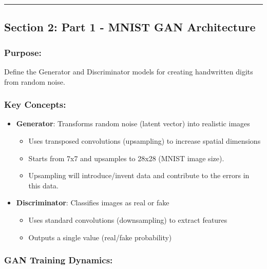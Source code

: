 \documentclass[11pt]{article}
\providecommand{\tightlist}{%
      \setlength{\itemsep}{0pt}\setlength{\parskip}{0pt}}
\begin{document}
    \begin{center}\rule{0.5\linewidth}{0.5pt}\end{center}

\subsection{Section 2: Part 1 - MNIST GAN
Architecture}\label{section-2-part-1---mnist-gan-architecture}

\subsubsection{Purpose:}\label{purpose}

Define the Generator and Discriminator models for creating handwritten
digits from random noise.

\subsubsection{Key Concepts:}\label{key-concepts}

\begin{itemize}
\tightlist
\item
  \textbf{Generator}: Transforms random noise (latent vector) into
  realistic images

  \begin{itemize}
  \tightlist
  \item
    Uses transposed convolutions (upsampling) to increase spatial
    dimensions
  \item
    Starts from 7x7 and upsamples to 28x28 (MNIST image size).
  \item
    Upsampling will introduce/invent data and contribute to the errors
    in this data.
  \end{itemize}
\item
  \textbf{Discriminator}: Classifies images as real or fake

  \begin{itemize}
  \tightlist
  \item
    Uses standard convolutions (downsampling) to extract features
  \item
    Outputs a single value (real/fake probability)
  \end{itemize}
\end{itemize}

\subsubsection{GAN Training Dynamics:}\label{gan-training-dynamics}
\end{document}
